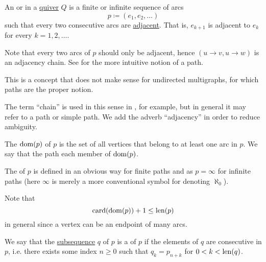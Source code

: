 \begin{definition}\label{def:quiver_adjacency_chain}
  An  or  in a \hyperref[def:graph/quiver]{quiver} \( Q \) is a finite or infinite sequence of arcs
  \begin{equation}\label{eq:def:quiver_adjacency_chain}
    p \coloneqq (e_1, e_2, \ldots)
  \end{equation}
  such that every two consecutive arcs are \hyperref[def:graph/adjacency_edges]{adjacent}. That is, \( e_{k+1} \) is adjacent to \( e_k \) for every \( k = 1, 2, \ldots \).

  Note that every two arcs of \( p \) should only be adjacent, hence \( (u \to v, u \to w) \) is an adjacency chain. See  for the more intuitive notion of a path.

  This is a concept that does not make sense for undirected multigraphs, for which paths are the proper notion.

  The term \enquote{chain} is used in this sense in \cite[ch. 1, sec. 3.1]{GondranMinoux1984Graphs}, for example, but in general it may refer to a path or simple path. We add the adverb \enquote{adjacency} in order to reduce ambiguity.

  \begin{thmenum}
     The  \( \operatorname{dom}(p) \) of \( p \) is the set of all vertices that belong to at least one arc in \( p \). We say that the path  each member of \( \operatorname{dom}(p) \).

     The  of \( p \) is defined in an obvious way for finite paths and as \( p = \infty \) for infinite paths (here \( \infty \) is merely a more conventional symbol for denoting \hyperref[thm:omega_is_a_cardinal]{\( \aleph_0 \)}).

    Note that
    \begin{equation}\label{eq:def:quiver_adjacency_chain/length_and_domain}
      \operatorname{card}(\operatorname{dom}(p)) + 1 \leq \operatorname{len}(p)
    \end{equation}
    in general since a vertex can be an endpoint of many arcs.

     We say that the \hyperref[def:subsequence]{subsequence} \( q \) of \( p \) is a  of \( p \) if the elements of \( q \) are consecutive in \( p \), i.e. there exists some index \( n \geq 0 \) such that \( q_k = p_{n + k} \) for \( 0 < k < \operatorname{len}(q) \).


\end{thmenum}
\end{definition}
